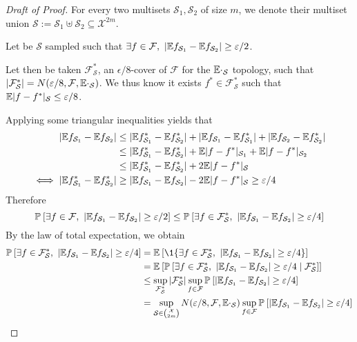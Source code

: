 \begin{proof}[Draft of Proof]
	For every two multisets $\mathcal{S}_1, \mathcal{S}_2$ of size $m$, we denote their multiset union $\mathcal{S} := \mathcal{S}_1 \uplus \mathcal{S}_2 \subseteq \mathcal{X}^{2m}$.

	Let be $\mathcal{S}$ sampled such that $\exists f \in \mathcal{F},\ |\EE {f_{\mathcal{S}_1}} - \EE {f_{\mathcal{S}_2}}| \geq \epsilon/2$. 
	
	Let then be taken $\mathcal{F^*_\mathcal{S}}$, an $\epsilon/8$-cover of $\mathcal{F}$ for the $\mathbb{E} \cdot_{\mathcal{S}}$ topology, such that $|\mathcal{F^*_\mathcal{S}}| = N(\varepsilon/8, \mathcal{F}, \mathbb{E} \cdot_{\mathcal{S}})$. We thus know it exists $f^* \in \mathcal{F^*_\mathcal{S}}$ such that $\mathbb{E} |f-f^*|_{\mathcal{S}} \leq \varepsilon/8$.

	Applying some triangular inequalities yields that
	\begin{align*}
		|\mathbb{E}{f_{\mathcal{S}_1}} - \mathbb{E}{f_{\mathcal{S}_2}}| &\leq |\mathbb{E}{f^*_{\mathcal{S}_1}} - \mathbb{E}{f^*_{\mathcal{S}_2}}| + |\mathbb{E}{f_{\mathcal{S}_1}} - \mathbb{E}{f^*_{\mathcal{S}_1}}| + |\mathbb{E}{f_{\mathcal{S}_2}} - \mathbb{E}{f^*_{\mathcal{S}_2}}|  \\
		&\leq |\mathbb{E}{f^*_{\mathcal{S}_1}} - \mathbb{E}{f^*_{\mathcal{S}_2}}| + \mathbb{E}|f-f^*|_{\mathcal{S}_1} + \mathbb{E}|f-f^*|_{\mathcal{S}_2} \\
		&\leq |\mathbb{E}{f^*_{\mathcal{S}_1}} - \mathbb{E}{f^*_{\mathcal{S}_2}}| + 2  \mathbb{E}|f-f^*|_{\mathcal{S}}\\
		\iff |\mathbb{E}{f^*_{\mathcal{S}_1}} - \mathbb{E}{f^*_{\mathcal{S}_2}}| &\geq |\mathbb{E}{f_{\mathcal{S}_1}} - \mathbb{E}{f_{\mathcal{S}_2}}| - 2  \mathbb{E}|f-f^*|_{\mathcal{S}} \geq \varepsilon/4 
	\end{align*}
	Therefore
	\begin{equation}
		\mathbb{P}_{}\left[\exists f \in \mathcal{F},\ |\mathbb{E} {f_{\mathcal{S}_1}} - \mathbb{E} {f_{\mathcal{S}_2}}| \geq \varepsilon/2\right] \leq \mathbb{P}_{}\left[\exists f \in \mathcal{F^*_\mathcal{S}},\ |\mathbb{E} {f_{\mathcal{S}_1}} - \mathbb{E} {f_{\mathcal{S}_2}}| \geq \varepsilon/4\right]
	\end{equation}
	By the law of total expectation, we obtain
	\begin{align*}
		\PPP{}{\exists f \in \mathcal{F^*_\mathcal{S}},\ |\EE {f_{\mathcal{S}_1}} - \EE {f_{\mathcal{S}_2}}| \geq \epsilon/4}
		&=\EEE{}{ \1 \{\exists f \in \mathcal{F^*_\mathcal{S}},\ |\EE {f_{\mathcal{S}_1}} - \EE {f_{\mathcal{S}_2}}| \geq \epsilon/4 \} }\\
		&=\EEE{}{ \PPP{}{\exists f \in \mathcal{F^*_\mathcal{S}},\ |\EE {f_{\mathcal{S}_1}} - \EE {f_{\mathcal{S}_2}}| \geq \epsilon/4 \mid \mathcal{F^*_\mathcal{S}}}  }\\
        &\leq \sup_{\mathcal{F^*_\mathcal{S}}} |\mathcal{F^*_\mathcal{S}}| \sup_{f \in \mathcal{F}} \PPP{}{\lvert \EE{f_{\mathcal{S}_1}} - \EE{f_{\mathcal{S}_2}} \rvert \geq \epsilon/4 }\\
		&= \sup_{\mathcal{S} \in \binom{\mathcal{X}}{2m} } N(\epsilon/8, \mathcal{F}, \EE \cdot_{\mathcal{S}}) \sup_{f \in \mathcal{F}} \PPP{}{\lvert \EE{f_{\mathcal{S}_1}} - \EE{f_{\mathcal{S}_2}} \rvert \geq \epsilon/4 }
	\end{align*}

\end{proof}